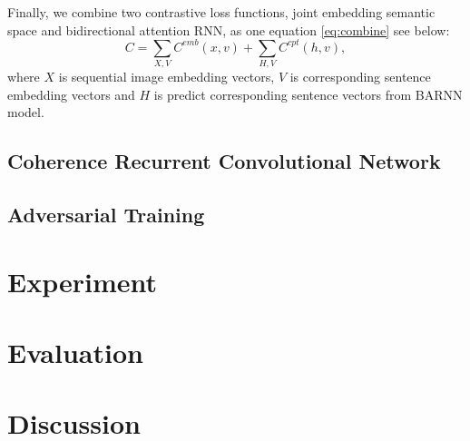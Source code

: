\documentclass[11pt]{article}
\begin{document}
Finally, we combine two contrastive loss functions, joint embedding semantic space and bidirectional attention RNN, as one equation \ref{eq:combine} see below:
\begin{equation}
C = \sum_{X,V} C^{emb}(x,v) + \sum_{H,V}C^{cpt}(h,v),
\label{eq:combine}
\end{equation}
where $X$ is sequential image embedding vectors, $V$ is corresponding sentence embedding vectors and $H$ is predict corresponding sentence vectors from BARNN model.


\subsection{Coherence Recurrent Convolutional Network}


\subsection{Adversarial Training}

		
\section{Experiment}
	
\section{Evaluation}


\section{Discussion}



\end{document}
